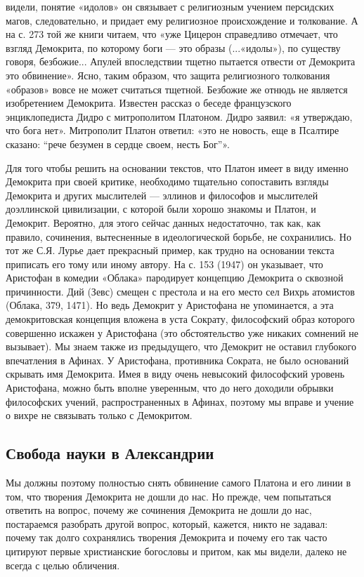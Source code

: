 видели, понятие «идолов» он связывает с религиозным учением персидских
магов, следовательно, и придает ему религиозное происхождение и
толкование. А на с. 273 той же книги читаем, что «уже Цицерон
справедливо отмечает, что взгляд Демокрита, по которому боги --- это
образы (...«идолы»), по существу говоря, безбожие... Апулей
впоследствии тщетно пытается отвести от Демокрита это обвинение».
Ясно, таким образом, что защита религиозного толкования «образов»
вовсе не может считаться тщетной. Безбожие же отнюдь не является
изобретением Демокрита. Известен рассказ о беседе французского
энциклопедиста Дидро с митрополитом Платоном. Дидро заявил: «я
утверждаю, что бога нет». Митрополит Платон ответил: «это не новость,
еще в Псалтире сказано: ``рече безумен в сердце своем, несть Бог''».

Для того чтобы решить на основании текстов, что Платон имеет в виду
именно Демокрита при своей критике, необходимо тщательно сопоставить
взгляды Демокрита и других мыслителей --- эллинов и философов и
мыслителей доэллинской цивилизации, с которой были хорошо знакомы и
Платон, и Демокрит. Вероятно, для этого сейчас данных недостаточно,
так как, как правило, сочинения, вытесненные в идеологической борьбе,
не сохранились. Но тот же С.Я. Лурье дает прекрасный пример, как
трудно на основании текста приписать его тому или иному автору. На с.
153 (1947) он указывает, что Аристофан в комедии «Облака» пародирует
концепцию Демокрита о сквозной причинности. Дий (Зевс) смещен с
престола и на его место сел Вихрь атомистов (Облака, 379, 1471). Но
ведь Демокрит у Аристофана не упоминается, а эта демокритовская
концепция вложена в уста Сократу, философский образ которого
совершенно искажен у Аристофана (это обстоятельство уже никаких
сомнений не вызывает). Мы знаем также из предыдущего, что Демокрит не
оставил глубокого впечатления в Афинах. У Аристофана, противника
Сократа, не было оснований скрывать имя Демокрита. Имея в виду очень
невысокий философский уровень Аристофана, можно быть вполне уверенным,
что до него доходили обрывки философских учений, распространенных в
Афинах, поэтому мы вправе и учение о вихре не связывать только с
Демокритом.

\subsection{Свобода науки в Александрии}

Мы должны поэтому полностью снять обвинение самого Платона и его
линии в том, что творения Демокрита не дошли до нас. Но прежде, чем
попытаться ответить на вопрос, почему же сочинения Демокрита не дошли
до нас, постараемся разобрать другой вопрос, который, кажется, никто
не задавал: почему так долго сохранялись творения Демокрита и почему
его так часто цитируют первые христианские богословы и притом, как мы
видели, далеко не всегда с целью обличения.

